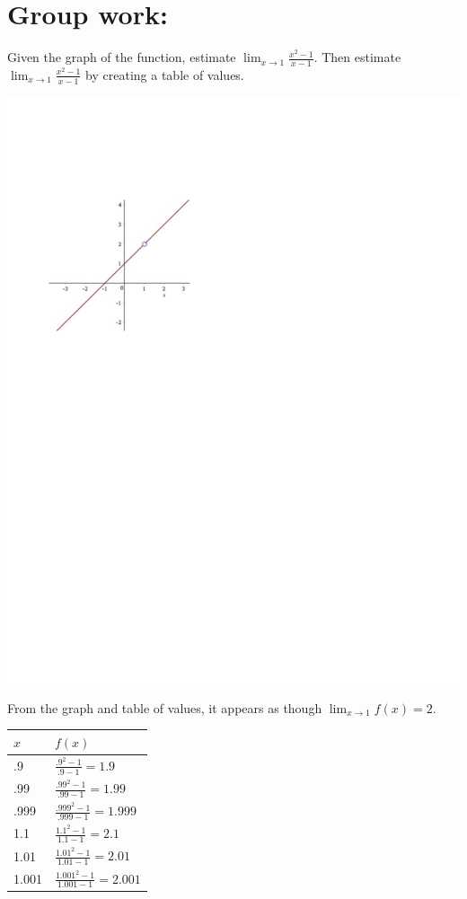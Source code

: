 \documentclass[handout,nooutcomes]{ximera}
\begin{document}
\section*{Group work:}
	
\begin{problem}
Given the graph of the function, estimate $\lim_{x \to 1} \frac{x^2 - 1}{x - 1} $.  Then estimate $\lim_{x \to 1} \frac{x^2 - 1}{x - 1} $ by creating a table of values.
	
	\begin{image}
	\includegraphics[trim= 50 470 300 135]{Figure1.pdf}
	\end{image}
	
	\begin{freeResponse}
	From the graph and table of values, it appears as though $\lim_{x \to 1} f(x) = 2$.
	
	\begin{tabular}{|l|l|}
	\hline
	\hspace{2mm} $x$ & \hspace{4mm} $f(x)$  \\
	\hline
	.9 & $ \frac{{{.9}^{2}}-1}{.9-1}=1.9  $  \\
	\hline
	.99 & $ \frac{{{.99}^{2}}-1}{.99-1}=1.99 $  \\
	\hline
	.999 & $ \frac{{{.999}^{2}}-1}{.999-1}=1.999 $  \\
	\hline
	1.1 & $ \frac{{{1.1}^{2}}-1}{1.1-1}=2.1 $  \\
	\hline
	1.01 & $ \frac{{{1.01}^{2}}-1}{1.01-1}=2.01 $  \\
	\hline
	1.001 & $ \frac{{{1.001}^{2}}-1}{1.001-1}=2.001 $  \\
	\hline
	\end{tabular}
	

\end{freeResponse}
\end{problem}
\end{document}
